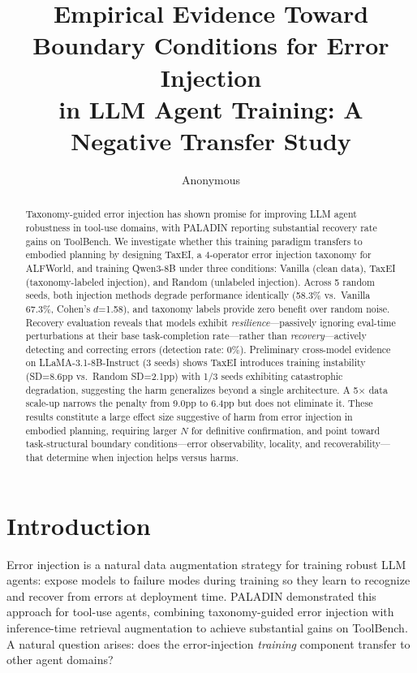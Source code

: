 \documentclass[11pt]{article}
\title{Empirical Evidence Toward Boundary Conditions for Error Injection\\in LLM Agent Training: A Negative Transfer Study}
\author{Anonymous}
\begin{document}
\maketitle

\begin{abstract}
Taxonomy-guided error injection has shown promise for improving LLM agent robustness in tool-use domains, with PALADIN reporting substantial recovery rate gains on ToolBench.
We investigate whether this training paradigm transfers to embodied planning by designing TaxEI, a 4-operator error injection taxonomy for ALFWorld, and training Qwen3-8B under three conditions: Vanilla (clean data), TaxEI (taxonomy-labeled injection), and Random (unlabeled injection).
Across 5 random seeds, both injection methods degrade performance identically (58.3\% vs.\ Vanilla 67.3\%, Cohen's $d$=1.58), and taxonomy labels provide zero benefit over random noise.
Recovery evaluation reveals that models exhibit \emph{resilience}---passively ignoring eval-time perturbations at their base task-completion rate---rather than \emph{recovery}---actively detecting and correcting errors (detection rate: 0\%).
Preliminary cross-model evidence on LLaMA-3.1-8B-Instruct (3 seeds) shows TaxEI introduces training instability (SD=8.6pp vs.\ Random SD=2.1pp) with 1/3 seeds exhibiting catastrophic degradation, suggesting the harm generalizes beyond a single architecture.
A 5$\times$ data scale-up narrows the penalty from 9.0pp to 6.4pp but does not eliminate it.
These results constitute a large effect size suggestive of harm from error injection in embodied planning, requiring larger $N$ for definitive confirmation, and point toward task-structural boundary conditions---error observability, locality, and recoverability---that determine when injection helps versus harms.
\end{abstract}

\section{Introduction}

Error injection is a natural data augmentation strategy for training robust LLM agents: expose models to failure modes during training so they learn to recognize and recover from errors at deployment time.
PALADIN \cite{chen2025paladin} demonstrated this approach for tool-use agents, combining taxonomy-guided error injection with inference-time retrieval augmentation to achieve substantial gains on ToolBench.
A natural question arises: does the error-injection \emph{training} component transfer to other agent domains?
\end{document}
